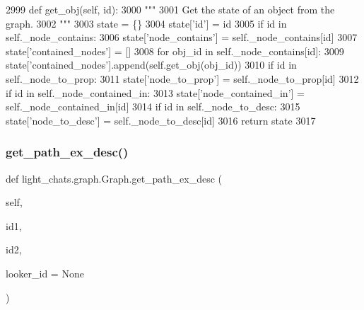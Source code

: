 \begin{DoxyCode}
2999     \textcolor{keyword}{def }get\_obj(self, id):
3000         \textcolor{stringliteral}{"""}
3001 \textcolor{stringliteral}{        Get the state of an object from the graph.}
3002 \textcolor{stringliteral}{        """}
3003         state = \{\}
3004         state[\textcolor{stringliteral}{'id'}] = id
3005         \textcolor{keywordflow}{if} id \textcolor{keywordflow}{in} self.\_node\_contains:
3006             state[\textcolor{stringliteral}{'node\_contains'}] = self.\_node\_contains[id]
3007             state[\textcolor{stringliteral}{'contained\_nodes'}] = []
3008             \textcolor{keywordflow}{for} obj\_id \textcolor{keywordflow}{in} self.\_node\_contains[id]:
3009                 state[\textcolor{stringliteral}{'contained\_nodes'}].append(self.get\_obj(obj\_id))
3010         \textcolor{keywordflow}{if} id \textcolor{keywordflow}{in} self.\_node\_to\_prop:
3011             state[\textcolor{stringliteral}{'node\_to\_prop'}] = self.\_node\_to\_prop[id]
3012         \textcolor{keywordflow}{if} id \textcolor{keywordflow}{in} self.\_node\_contained\_in:
3013             state[\textcolor{stringliteral}{'node\_contained\_in'}] = self.\_node\_contained\_in[id]
3014         \textcolor{keywordflow}{if} id \textcolor{keywordflow}{in} self.\_node\_to\_desc:
3015             state[\textcolor{stringliteral}{'node\_to\_desc'}] = self.\_node\_to\_desc[id]
3016         \textcolor{keywordflow}{return} state
3017 
\end{DoxyCode}
\mbox{\label{classlight__chats_1_1graph_1_1Graph_adf4ddcd30a97e5d02bc23f5c0a09c8bb}} 
\subsubsection{\texorpdfstring{get\+\_\+path\+\_\+ex\+\_\+desc()}{get\_path\_ex\_desc()}}
{\footnotesize\ttfamily def light\+\_\+chats.\+graph.\+Graph.\+get\+\_\+path\+\_\+ex\+\_\+desc (\begin{DoxyParamCaption}\item[{}]{self,  }\item[{}]{id1,  }\item[{}]{id2,  }\item[{}]{looker\+\_\+id = {\ttfamily None} }\end{DoxyParamCaption})}

